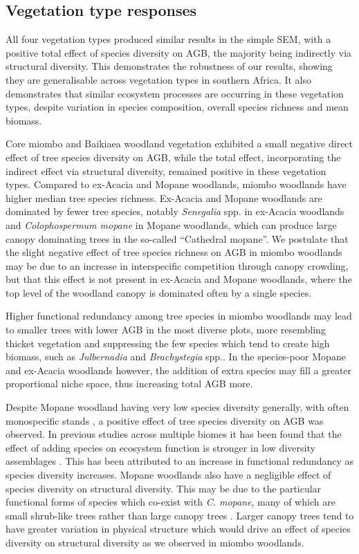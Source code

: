 \begin{refsection}
\subsection{Vegetation type responses}
\label{befr:ssec:veg_type_response}

All four vegetation types produced similar results in the simple SEM, with a positive total effect of species diversity on AGB, the majority being indirectly via structural diversity. This demonstrates the robustness of our results, showing they are generalisable across vegetation types in southern Africa. It also demonstrates that similar ecosystem processes are occurring in these vegetation types, despite variation in species composition, overall species richness and mean biomass.

Core miombo and Baikiaea woodland vegetation exhibited a small negative direct effect of tree species diversity on AGB, while the total effect, incorporating the indirect effect via structural diversity, remained positive in these vegetation types. Compared to ex-Acacia and Mopane woodlands, miombo woodlands have higher median tree species richness. Ex-Acacia and Mopane woodlands are dominated by fewer tree species, notably \textit{Senegalia} spp. in ex-Acacia woodlands and \textit{Colophospermum mopane} in Mopane woodlands, which can produce large canopy dominating trees in the so-called ``Cathedral mopane''. We postulate that the slight negative effect of tree species richness on AGB in miombo woodlands may be due to an increase in interspecific competition through canopy crowding, but that this effect is not present in ex-Acacia and Mopane woodlands, where the top level of the woodland canopy is dominated often by a single species. 

Higher functional redundancy among tree species in miombo woodlands may lead to smaller trees with lower AGB in the most diverse plots, more resembling thicket vegetation and suppressing the few species which tend to create high biomass, such as \textit{Julbernadia} and \textit{Brachystegia} spp.. In the species-poor Mopane and ex-Acacia woodlands however, the addition of extra species may fill a greater proportional niche space, thus increasing total AGB more. 

Despite Mopane woodland having very low species diversity generally, with often monospecific stands \citep{Timberlake2010}, a positive effect of tree species diversity on AGB was observed. In previous studies across multiple biomes it has been found that the effect of adding species on ecosystem function is stronger in low diversity assemblages \citep{Cardinale2006, Srivastava2005}. This has been attributed to an increase in functional redundancy as species diversity increases. Mopane woodlands also have a negligible effect of species diversity on structural diversity. This may be due to the particular functional forms of species which co-exist with \textit{C. mopane}, many of which are small shrub-like trees rather than large canopy trees \citep{Timberlake2010}. Larger canopy trees tend to have greater variation in physical structure \citep{Seidel2019} which would drive an effect of species diversity on structural diversity as we observed in miombo woodlands.


\end{refsection}
